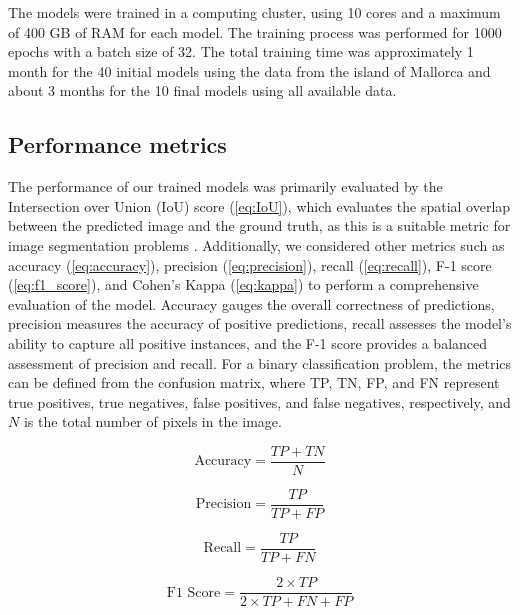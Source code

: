 The models were trained in a computing cluster, using 10 cores and a maximum of
400 GB of RAM for each model. The training process was performed for 1000
epochs with a batch size of 32. The total training time was approximately 1
month for the 40 initial models using the data from the island of Mallorca and
about 3 months for the 10 final models using all available data.

\subsection{Performance metrics}

The performance of our trained models was primarily evaluated by the
Intersection over Union (IoU) score (\cref{eq:IoU}), which evaluates the
spatial overlap between the predicted image and the ground truth, as this is a
suitable metric for image segmentation problems \cite{rahman2016optimizing}.
Additionally, we considered other metrics such as accuracy
(\cref{eq:accuracy}), precision (\cref{eq:precision}), recall
(\cref{eq:recall}), F-1 score (\cref{eq:f1_score}), and Cohen's Kappa
(\cref{eq:kappa}) to perform a comprehensive evaluation of the model. Accuracy
gauges the overall correctness of predictions, precision measures the accuracy
of positive predictions, recall assesses the model's ability to capture all
positive instances, and the F-1 score provides a balanced assessment of
precision and recall. For a binary classification problem, the metrics can be
defined from the confusion matrix, where TP, TN, FP, and FN represent true
positives, true negatives, false positives, and false negatives, respectively,
and $N$ is the total number of pixels in the image.

\begin{equation}\label{eq:accuracy}
    \text{Accuracy} = \frac{TP + TN}{N}
\end{equation}

\begin{equation}\label{eq:precision}
    \text{Precision} = \frac{TP}{TP + FP}
\end{equation}

\begin{equation}\label{eq:recall}
    \text{Recall} = \frac{TP}{TP + FN}
\end{equation}

\begin{equation}\label{eq:f1_score}
    \text{F1 Score} = \frac{2\times TP}{2\times TP + FN + FP}
\end{equation}

